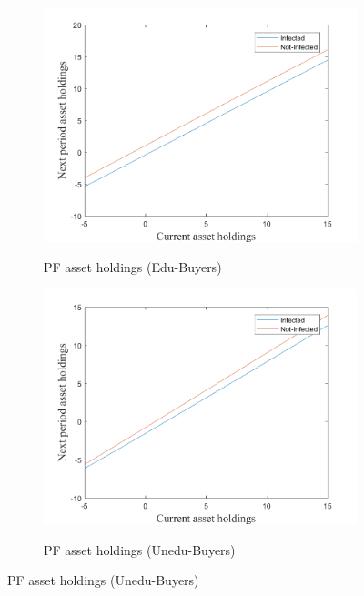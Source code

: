 \begin{figure}[H]\caption{Maturity and diffusion}
\begin{subfigure}{0.5\textwidth}\caption{PF asset holdings (Edu-Buyers)}
   \includegraphics[width=\linewidth,height = 0.22\textheight]{figures/matu/FIG1.png}
    \label{fig_dert}
\end{subfigure}
\hspace*{\fill}
\begin{subfigure}{0.5\textwidth}\caption{PF asset holdings (Unedu-Buyers)}
   \includegraphics[width=\linewidth,height = 0.22\textheight]{figures/matu/FIG2.png}
    \label{fig:x_b}
\end{subfigure}

\end{figure}
